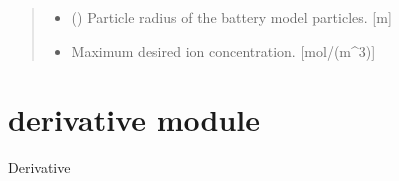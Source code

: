 \documentclass[letterpaper,10pt,english]{sphinxmanual}
\begin{document}
\begin{fulllineitems}
\begin{fulllineitems}
\begin{quote}
\begin{description}
\begin{itemize}
\item {} 
\sphinxAtStartPar
{} (\sphinxstyleliteralemphasis{\sphinxupquote{{[}}}\sphinxstyleliteralemphasis{\sphinxupquote{{]}}}) \textendash{} Particle radius of the battery model particles. {[}m{]}

\item {} 
\sphinxAtStartPar
{} \textendash{} Maximum desired ion concentration. {[}mol/(m\textasciicircum{}3){]}

\end{itemize}

\end{description}\end{quote}

\end{fulllineitems}


\begin{fulllineitems}
\label{\detokenize{batterycell:batterycell.BatteryCell.get_voltage}}
\end{fulllineitems}


\end{fulllineitems}



\section{derivative module}
\label{\detokenize{derivative:module-derivative}}\label{\detokenize{derivative:derivative-module}}\label{\detokenize{derivative::doc}}
\sphinxAtStartPar
Derivative
\end{document}
